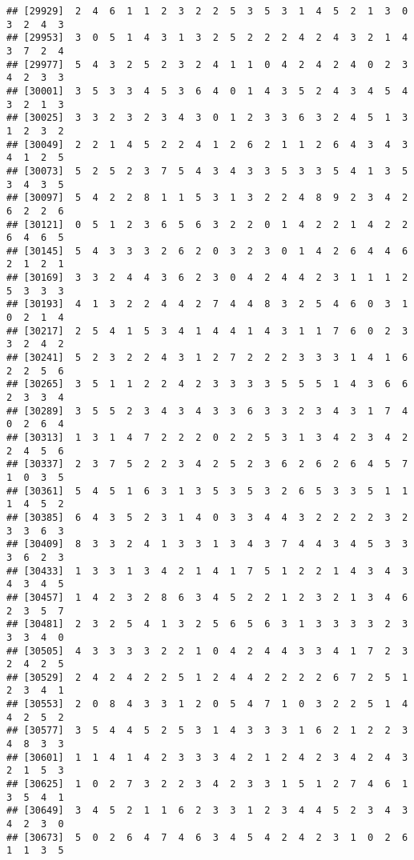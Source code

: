\documentclass[
]{article}
\begin{document}
\begin{verbatim}
## [29929]  2  4  6  1  1  2  3  2  2  5  3  5  3  1  4  5  2  1  3  0  3  2  4  3
## [29953]  3  0  5  1  4  3  1  3  2  5  2  2  2  4  2  4  3  2  1  4  3  7  2  4
## [29977]  5  4  3  2  5  2  3  2  4  1  1  0  4  2  4  2  4  0  2  3  4  2  3  3
## [30001]  3  5  3  3  4  5  3  6  4  0  1  4  3  5  2  4  3  4  5  4  3  2  1  3
## [30025]  3  3  2  3  2  3  4  3  0  1  2  3  3  6  3  2  4  5  1  3  1  2  3  2
## [30049]  2  2  1  4  5  2  2  4  1  2  6  2  1  1  2  6  4  3  4  3  4  1  2  5
## [30073]  5  2  5  2  3  7  5  4  3  4  3  3  5  3  3  5  4  1  3  5  3  4  3  5
## [30097]  5  4  2  2  8  1  1  5  3  1  3  2  2  4  8  9  2  3  4  2  6  2  2  6
## [30121]  0  5  1  2  3  6  5  6  3  2  2  0  1  4  2  2  1  4  2  2  6  4  6  5
## [30145]  5  4  3  3  3  2  6  2  0  3  2  3  0  1  4  2  6  4  4  6  2  1  2  1
## [30169]  3  3  2  4  4  3  6  2  3  0  4  2  4  4  2  3  1  1  1  2  5  3  3  3
## [30193]  4  1  3  2  2  4  4  2  7  4  4  8  3  2  5  4  6  0  3  1  0  2  1  4
## [30217]  2  5  4  1  5  3  4  1  4  4  1  4  3  1  1  7  6  0  2  3  3  2  4  2
## [30241]  5  2  3  2  2  4  3  1  2  7  2  2  2  3  3  3  1  4  1  6  2  2  5  6
## [30265]  3  5  1  1  2  2  4  2  3  3  3  3  5  5  5  1  4  3  6  6  2  3  3  4
## [30289]  3  5  5  2  3  4  3  4  3  3  6  3  3  2  3  4  3  1  7  4  0  2  6  4
## [30313]  1  3  1  4  7  2  2  2  0  2  2  5  3  1  3  4  2  3  4  2  2  4  5  6
## [30337]  2  3  7  5  2  2  3  4  2  5  2  3  6  2  6  2  6  4  5  7  1  0  3  5
## [30361]  5  4  5  1  6  3  1  3  5  3  5  3  2  6  5  3  3  5  1  1  1  4  5  2
## [30385]  6  4  3  5  2  3  1  4  0  3  3  4  4  3  2  2  2  2  3  2  3  3  6  3
## [30409]  8  3  3  2  4  1  3  3  1  3  4  3  7  4  4  3  4  5  3  3  3  6  2  3
## [30433]  1  3  3  1  3  4  2  1  4  1  7  5  1  2  2  1  4  3  4  3  4  3  4  5
## [30457]  1  4  2  3  2  8  6  3  4  5  2  2  1  2  3  2  1  3  4  6  2  3  5  7
## [30481]  2  3  2  5  4  1  3  2  5  6  5  6  3  1  3  3  3  3  2  3  3  3  4  0
## [30505]  4  3  3  3  3  2  2  1  0  4  2  4  4  3  3  4  1  7  2  3  2  4  2  5
## [30529]  2  4  2  4  2  2  5  1  2  4  4  2  2  2  2  6  7  2  5  1  2  3  4  1
## [30553]  2  0  8  4  3  3  1  2  0  5  4  7  1  0  3  2  2  5  1  4  4  2  5  2
## [30577]  3  5  4  4  5  2  5  3  1  4  3  3  3  1  6  2  1  2  2  3  4  8  3  3
## [30601]  1  1  4  1  4  2  3  3  3  4  2  1  2  4  2  3  4  2  4  3  2  1  5  3
## [30625]  1  0  2  7  3  2  2  3  4  2  3  3  1  5  1  2  7  4  6  1  3  5  4  1
## [30649]  3  4  5  2  1  1  6  2  3  3  1  2  3  4  4  5  2  3  4  3  4  2  3  0
## [30673]  5  0  2  6  4  7  4  6  3  4  5  4  2  4  2  3  1  0  2  6  1  1  3  5

\end{verbatim}
\end{document}
